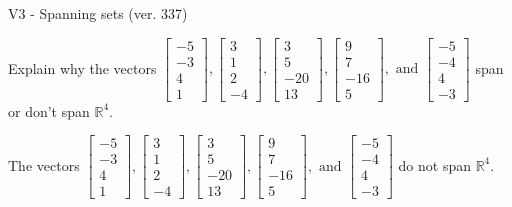 \begin{exercise}
  \begin{exerciseTitle}V3 - Spanning sets (ver. 337)\end{exerciseTitle}
  \begin{exerciseStatement}
    Explain why the vectors \(\left[\begin{array}{r}
-5 \\
-3 \\
4 \\
1
\end{array}\right] , \left[\begin{array}{r}
3 \\
1 \\
2 \\
-4
\end{array}\right] , \left[\begin{array}{r}
3 \\
5 \\
-20 \\
13
\end{array}\right] , \left[\begin{array}{r}
9 \\
7 \\
-16 \\
5
\end{array}\right] , \text{ and } \left[\begin{array}{r}
-5 \\
-4 \\
4 \\
-3
\end{array}\right]\) span or don't span \(\mathbb{R}^4\). 
	


  \end{exerciseStatement}
  \begin{exerciseAnswer}
   The vectors \(\left[\begin{array}{r}
-5 \\
-3 \\
4 \\
1
\end{array}\right] , \left[\begin{array}{r}
3 \\
1 \\
2 \\
-4
\end{array}\right] , \left[\begin{array}{r}
3 \\
5 \\
-20 \\
13
\end{array}\right] , \left[\begin{array}{r}
9 \\
7 \\
-16 \\
5
\end{array}\right] , \text{ and } \left[\begin{array}{r}
-5 \\
-4 \\
4 \\
-3
\end{array}\right]\) 
  	 do not  
	span \(\mathbb{R}^4\).
  



\end{exerciseAnswer}
\end{exercise}

